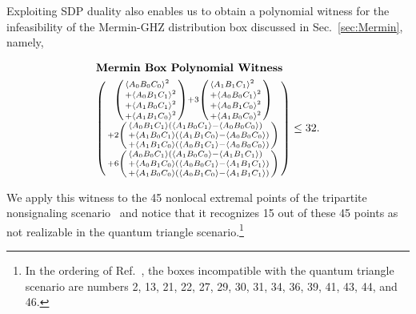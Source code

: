 \documentclass[superscriptaddress,aps,prx,nofootinbib,twocolumn,twoside,reprint,letterpaper,longbibliography]{revtex4-2}
\DeclarePairedDelimiter{\expec}{\langle}{\rangle}
\begin{document}
Exploiting SDP duality also enables us to obtain a polynomial witness for the infeasibility of the Mermin-GHZ distribution box discussed in Sec.~\ref{sec:Mermin}, namely,
\begin{samepage}
\begin{align}
\nonumber&\textbf{Mermin Box Polynomial Witness}\\
&\begin{psmallmatrix*}[c]
\begin{psmallmatrix*}[l]
   \expec{A_0B_0C_0}{}^2\\
  +\expec{A_0B_1C_1}{}^2\\
  +\expec{A_1B_0C_1}{}^2\\
  +\expec{A_1B_1C_0}{}^2
 \end{psmallmatrix*}
 +3 \begin{psmallmatrix*}[l]
   \expec{A_1B_1C_1}{}^2 \\
  +\expec{A_0B_0C_1}{}^2\\
  +\expec{A_0B_1C_0}{}^2\\
  +\expec{A_1B_0C_0}{}^2 \end{psmallmatrix*}
  \\
+2\begin{psmallmatrix*}[l]
   \expec{A_0B_1C_1} \left(\expec{A_1B_0C_1}-\expec{A_0B_0C_0}\right)\\
  +\expec{A_1B_0C_1} \left(\expec{A_1B_1C_0}-\expec{A_0B_0C_0}\right)\\
  +\expec{A_1B_1C_0} \left(\expec{A_0B_1C_1}-\expec{A_0B_0C_0}\right)\\
  \end{psmallmatrix*}
  \\
+6 \begin{psmallmatrix*}[l]
   \expec{A_0B_0C_1} \left(\expec{A_1B_0C_0}-\expec{A_1B_1C_1}\right)\\
 + \expec{A_0B_1C_0} \left(\expec{A_0B_0C_1}-\expec{A_1B_1C_1}\right) \\
 + \expec{A_1B_0C_0} \left(\expec{A_0B_1C_0}-\expec{A_1B_1C_1}\right)
 \end{psmallmatrix*}
\end{psmallmatrix*}\leq 32.
\label{eq:merminwitness}
\end{align}\end{samepage}
We apply this witness to the 45 nonlocal extremal points of the tripartite nonsignaling scenario~\cite{tripartiteNS} and notice that it recognizes 15 out of these 45 points as not realizable in the quantum triangle scenario.\footnote{In the ordering of Ref.~\cite{tripartiteNS}, the boxes incompatible with the quantum triangle scenario are numbers 2, 13, 21, 22, 27, 29, 30, 31, 34, 36, 39, 41, 43, 44, and 46.}
\end{document}
